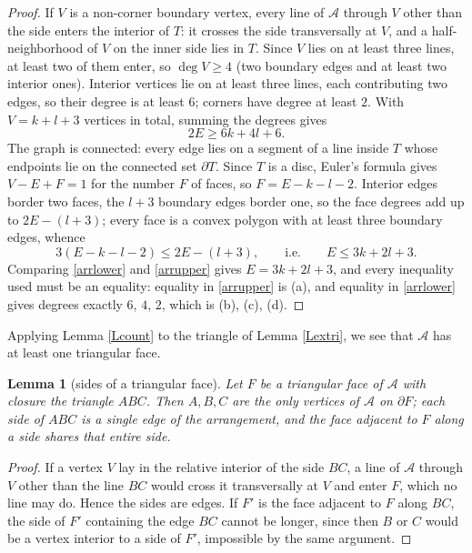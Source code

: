 \documentclass{article}
\newtheorem{lemma}{Lemma}
\begin{document}
	\begin{proof}
		If $V$ is a non-corner boundary vertex, every line of $\mathcal A$ through $V$ other than the side enters the interior of $T$: it crosses the side transversally at $V$, and a half-neighborhood of $V$ on the inner side lies in $T$. Since $V$ lies on at least three lines, at least two of them enter, so $\deg V\geq4$ (two boundary edges and at least two interior ones). Interior vertices lie on at least three lines, each contributing two edges, so their degree is at least $6$; corners have degree at least $2$. With $V=k+l+3$ vertices in total, summing the degrees gives
		\begin{equation}\label{arrlower}
			2E\geq 6k+4l+6 .
		\end{equation}
		The graph is connected: every edge lies on a segment of a line inside $T$ whose endpoints lie on the connected set $\partial T$. Since $T$ is a disc, Euler's formula gives $V-E+F=1$ for the number $F$ of faces, so $F=E-k-l-2$. Interior edges border two faces, the $l+3$ boundary edges border one, so the face degrees add up to $2E-(l+3)$; every face is a convex polygon with at least three boundary edges, whence
		\begin{equation}\label{arrupper}
			3(E-k-l-2)\leq 2E-(l+3),\qquad\text{i.e.}\qquad E\leq 3k+2l+3 .
		\end{equation}
		Comparing \eqref{arrlower} and \eqref{arrupper} gives $E=3k+2l+3$, and every inequality used must be an equality: equality in \eqref{arrupper} is (a), and equality in \eqref{arrlower} gives degrees exactly $6$, $4$, $2$, which is (b), (c), (d).
	\end{proof}

	Applying Lemma \ref{Lcount} to the triangle of Lemma \ref{Lextri}, we see that $\mathcal A$ has at least one triangular face.

	\begin{lemma}[sides of a triangular face]\label{Lsides}
		Let $F$ be a triangular face of $\mathcal A$ with closure the triangle $ABC$. Then $A,B,C$ are the only vertices of $\mathcal A$ on $\partial F$; each side of $ABC$ is a single edge of the arrangement, and the face adjacent to $F$ along a side shares that entire side.
	\end{lemma}

	\begin{proof}
		If a vertex $V$ lay in the relative interior of the side $BC$, a line of $\mathcal A$ through $V$ other than the line $BC$ would cross it transversally at $V$ and enter $F$, which no line may do. Hence the sides are edges. If $F'$ is the face adjacent to $F$ along $BC$, the side of $F'$ containing the edge $BC$ cannot be longer, since then $B$ or $C$ would be a vertex interior to a side of $F'$, impossible by the same argument.
	\end{proof}
\end{document}
